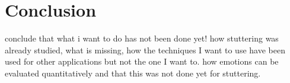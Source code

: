 \section{Conclusion}

conclude that what i want to do has not been done yet!
how stuttering was already studied, what is missing, how the techniques I want to use have been used for other applications but not the one I want to. how emotions can be evaluated quantitatively and that this was not done yet for stuttering. 


% 
% 
% 
% 


